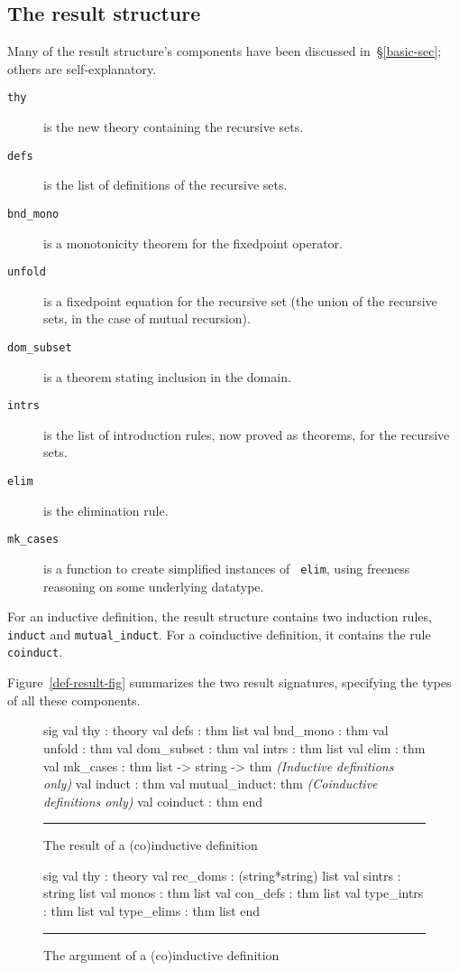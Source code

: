 \subsection{The result structure}
Many of the result structure's components have been discussed
in~\S\ref{basic-sec}; others are self-explanatory.
\begin{description}
\item[\tt thy] is the new theory containing the recursive sets.

\item[\tt defs] is the list of definitions of the recursive sets.

\item[\tt bnd\_mono] is a monotonicity theorem for the fixedpoint operator.

\item[\tt unfold] is a fixedpoint equation for the recursive set (the union of
the recursive sets, in the case of mutual recursion).

\item[\tt dom\_subset] is a theorem stating inclusion in the domain.

\item[\tt intrs] is the list of introduction rules, now proved as theorems, for
the recursive sets.

\item[\tt elim] is the elimination rule.

\item[\tt mk\_cases] is a function to create simplified instances of {\tt
elim}, using freeness reasoning on some underlying datatype.
\end{description}

For an inductive definition, the result structure contains two induction rules,
{\tt induct} and \verb|mutual_induct|.  For a coinductive definition, it
contains the rule \verb|coinduct|.

Figure~\ref{def-result-fig} summarizes the two result signatures,
specifying the types of all these components.

\begin{figure}
\begin{ttbox}
sig
val thy          : theory
val defs         : thm list
val bnd_mono     : thm
val unfold       : thm
val dom_subset   : thm
val intrs        : thm list
val elim         : thm
val mk_cases     : thm list -> string -> thm
{\it(Inductive definitions only)} 
val induct       : thm
val mutual_induct: thm
{\it(Coinductive definitions only)}
val coinduct    : thm
end
\end{ttbox}
\hrule
\caption{The result of a (co)inductive definition} \label{def-result-fig}

\medskip
\begin{ttbox}
sig  
val thy          : theory
val rec_doms     : (string*string) list
val sintrs       : string list
val monos        : thm list
val con_defs     : thm list
val type_intrs   : thm list
val type_elims   : thm list
end
\end{ttbox}
\hrule
\caption{The argument of a (co)inductive definition} \label{def-arg-fig}
\end{figure}

